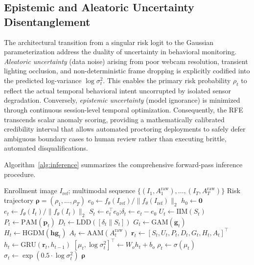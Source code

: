 \documentclass[journal]{IEEEtran}
\begin{document}
\subsection{Epistemic and Aleatoric Uncertainty Disentanglement}

The architectural transition from a singular risk logit to the Gaussian parameterization address the duality of uncertainty in behavioral monitoring. \emph{Aleatoric uncertainty} (data noise) arising from poor webcam resolution, transient lighting occlusion, and non-deterministic frame dropping is explicitly codified into the predicted log-variance $\log \sigma_t^2$. This enables the primary risk probability $\rho_t$ to reflect the actual temporal behavioral intent uncorrupted by isolated sensor degradation. Conversely, \emph{epistemic uncertainty} (model ignorance) is minimized through continuous session-level temporal optimization. Consequently, the RFE transcends scalar anomaly scoring, providing a mathematically calibrated credibility interval that allows automated proctoring deployments to safely defer ambiguous boundary cases to human review rather than executing brittle, automated disqualifications.

Algorithm~\ref{alg:inference} summarizes the comprehensive forward-pass inference procedure.

\begin{algorithm}[t]
\caption{TBIE Session Inference}
\label{alg:inference}
\begin{algorithmic}[1]
\REQUIRE Enrollment image $I_{\mathrm{ref}}$; multimodal sequence $\{(I_1, A_1^{\mathrm{raw}}), \dots, (I_T, A_T^{\mathrm{raw}})\}$
\ENSURE Risk trajectory $\bm{\rho} = (\rho_1, \ldots, \rho_T)$
\STATE $e_0 \leftarrow f_\theta(I_{\mathrm{ref}}) / \lVert f_\theta(I_{\mathrm{ref}}) \rVert_2$ 
\STATE $h_0 \leftarrow \mathbf{0}$ 
    \STATE $e_t \leftarrow f_\theta(I_t) / \lVert f_\theta(I_t) \rVert_2$
    \STATE $S_t \leftarrow e_t^\top e_0$;\quad $\delta_t \leftarrow e_t - e_0$
    \STATE $U_t \leftarrow \mathrm{IIM}(S_t)$ 
    \STATE $P_t \leftarrow \mathrm{PAM}(\mathbf{p}_t)$ 
    \STATE $D_t \leftarrow \mathrm{LDD}([\delta_t \| S_t])$ 
    \STATE $G_t \leftarrow \mathrm{GAM}(\mathbf{g}_t)$ 
    \STATE $H_t \leftarrow \mathrm{HGDM}(\mathbf{hg}_t)$ 
    \STATE $A_t \leftarrow \mathrm{AAM}(A_t^{\mathrm{raw}})$ 
    \STATE $\mathbf{r}_t \leftarrow [S_t, U_t, P_t, D_t, G_t, H_t, A_t]^\top$
    \STATE $h_t \leftarrow \mathrm{GRU}(\mathbf{r}_t, h_{t-1})$
    \STATE $[\mu_t, \log \sigma_t^2]^\top \leftarrow W_o h_t + b_o$
    \STATE $\rho_t \leftarrow \sigma(\mu_t)$
    \STATE $\sigma_t \leftarrow \exp(0.5 \cdot \log \sigma_t^2)$
\ENDFOR
\RETURN $\bm{\rho}$
\end{algorithmic}
\end{algorithm}
\end{document}
